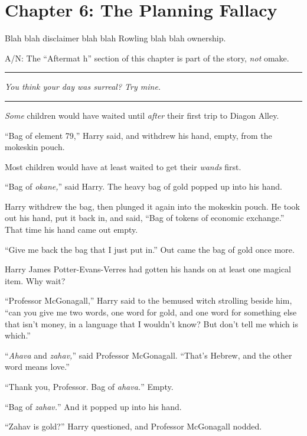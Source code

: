 \chapter{Chapter 6: The Planning Fallacy}
Blah blah disclaimer blah blah Rowling blah blah ownership.

A/N: The ``Aftermat h'' section of this chapter is part of the story, \emph{not} omake.

\begin{center}\rule{3in}{0.4pt}\end{center}

\emph{You think your day was surreal? Try mine.}

\begin{center}\rule{3in}{0.4pt}\end{center}

\emph{Some} children would have waited until \emph{after} their first trip to Diagon Alley.

``Bag of element 79,'' Harry said, and withdrew his hand, empty, from the mokeskin pouch.

Most children would have at least waited to get their \emph{wands} first.

``Bag of \emph{okane,}'' said Harry. The heavy bag of gold popped up into his hand.

Harry withdrew the bag, then plunged it again into the mokeskin pouch. He took out his hand, put it back in, and said, ``Bag of tokens of economic exchange.'' That time his hand came out empty.

``Give me back the bag that I just put in.'' Out came the bag of gold once more.

Harry James Potter-Evans-Verres had gotten his hands on at least one magical item. Why wait?

``Professor McGonagall,'' Harry said to the bemused witch strolling beside him, ``can you give me two words, one word for gold, and one word for something else that isn't money, in a language that I wouldn't know? But don't tell me which is which.''

``\emph{Ahava} and \emph{zahav,}'' said Professor McGonagall. ``That's Hebrew, and the other word means love.''

``Thank you, Professor. Bag of \emph{ahava.}'' Empty.

``Bag of \emph{zahav.}'' And it popped up into his hand.

``Zahav is gold?'' Harry questioned, and Professor McGonagall nodded.


